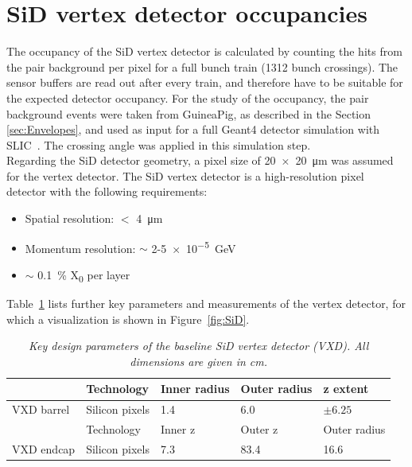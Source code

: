 \section{SiD vertex detector occupancies}
The occupancy of the SiD vertex detector is calculated by counting the hits from the pair background per pixel for a full bunch train (1312 bunch crossings).
The sensor buffers are read out after every train, and therefore have to be suitable for the expected detector occupancy.
For the study of the occupancy, the pair background events were taken from GuineaPig, as described in the Section \ref{sec:Envelopes}, and used as input for a full Geant4 detector simulation with SLIC~\cite{SLIC}.
The crossing angle was applied in this simulation step.\\
Regarding the SiD detector geometry, a pixel size of \SI{20x20}{\micro\meter} was assumed for the vertex detector.
The SiD vertex detector is a high-resolution pixel detector with the following requirements:
\begin{itemize}
 \item Spatial resolution: $<$ \SI{4}{\micro\meter}
 \item Momentum resolution: $\sim$ 2-\SI{5e-5}{\GeV}
 \item $\sim$ \SI{0.1}{\percent} X\textsubscript{0} per layer
\end{itemize}
Table~\ref{tab:KeyParametersSiD} lists further key parameters and measurements of the vertex detector, for which a visualization is shown in Figure~\ref{fig:SiD}.
\begin{table}[h]
\caption{\textit{Key design parameters of the baseline SiD vertex detector (VXD). All dimensions are given in cm.}}
\label{tab:KeyParametersSiD}
\centering
\begin{tabularx}{\textwidth}{l|llll}
\hline\hline
& Technology & Inner radius & Outer radius & z extent\\
\hline
VXD barrel & Silicon pixels & 1.4 & 6.0 & $\pm 6.25$ \\
\hline\hline
& Technology & Inner z & Outer z & Outer radius\\
\hline
VXD endcap & Silicon pixels & 7.3 & 83.4 & 16.6 \\
\hline\hline
\end{tabularx}
\end{table}

